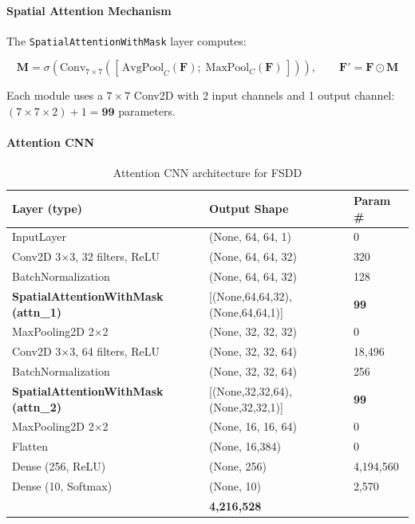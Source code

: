 \paragraph{Spatial Attention Mechanism}

The \texttt{SpatialAttentionWithMask} layer computes:

\begin{equation}
    \mathbf{M} = \sigma\!\left(
	  \text{Conv}_{7\times 7}\!\left(
		\left[\,\text{AvgPool}_{C}(\mathbf{F});\;
			\text{MaxPool}_{C}(\mathbf{F})\,\right]
	  \right)
    \right), \qquad
    \mathbf{F}' = \mathbf{F} \odot \mathbf{M}
\end{equation}

Each module uses a $7\times7$ Conv2D with 2 input channels and 1 output channel:
$(7\times7\times2)+1 = \mathbf{99}$ parameters.

\paragraph{Attention CNN}

\begin{table}[H]
\centering
\caption{Attention CNN architecture for FSDD}
\label{tab:b_attention_arch}
\begin{tabular}{L{5.5cm} C{3.8cm} C{2cm}}
\toprule
{}
\textbf{Layer (type)} & \textbf{Output Shape} & \textbf{Param \#} \\
\midrule
InputLayer                                       & (None, 64, 64, 1)  & 0 \\
Conv2D 3$\times$3, 32 filters, ReLU             & (None, 64, 64, 32) & 320 \\
BatchNormalization                               & (None, 64, 64, 32) & 128 \\
\textbf{SpatialAttentionWithMask (attn\_1)}      & [(None,64,64,32), (None,64,64,1)] & \textbf{99} \\
MaxPooling2D 2$\times$2                          & (None, 32, 32, 32) & 0 \\
Conv2D 3$\times$3, 64 filters, ReLU             & (None, 32, 32, 64) & 18,496 \\
BatchNormalization                               & (None, 32, 32, 64) & 256 \\
\textbf{SpatialAttentionWithMask (attn\_2)}      & [(None,32,32,64), (None,32,32,1)] & \textbf{99} \\
MaxPooling2D 2$\times$2                          & (None, 16, 16, 64) & 0 \\
Flatten                                          & (None, 16,384)      & 0 \\
Dense (256, ReLU)                                & (None, 256)         & 4,194,560 \\
Dense (10, Softmax)                              & (None, 10)          & 2,570 \\
\midrule
{}
 & \textbf{4,216,528} \\
\bottomrule
\end{tabular}
\end{table}

